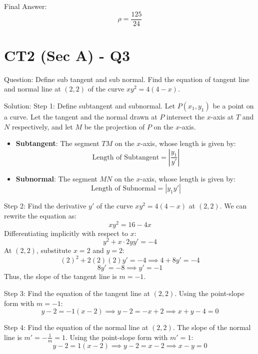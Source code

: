 \documentclass{article}
\begin{document}
Final Answer:
\[
\boxed{\rho = \frac{125}{24}}
\]

\section*{CT2 (Sec A) - Q3}
Question:
Define sub tangent and sub normal. Find the equation of tangent line and normal line at $(2, 2)$ of the curve $xy^2 = 4(4-x)$.

Solution:
Step 1: Define subtangent and subnormal.
Let $P(x_1, y_1)$ be a point on a curve. Let the tangent and the normal drawn at $P$ intersect the $x$-axis at $T$ and $N$ respectively, and let $M$ be the projection of $P$ on the $x$-axis.
\begin{itemize}
    \item \textbf{Subtangent}: The segment $TM$ on the $x$-axis, whose length is given by:
    \[
    \text{Length of Subtangent} = \left| \frac{y_1}{y'} \right|
    \]
    \item \textbf{Subnormal}: The segment $MN$ on the $x$-axis, whose length is given by:
    \[
    \text{Length of Subnormal} = |y_1 y'|
    \]
\end{itemize}

Step 2: Find the derivative $y'$ of the curve $xy^2 = 4(4-x)$ at $(2, 2)$.
We can rewrite the equation as:
\[
xy^2 = 16 - 4x
\]
Differentiating implicitly with respect to $x$:
\[
y^2 + x \cdot 2y y' = -4
\]
At $(2, 2)$, substitute $x = 2$ and $y = 2$:
\[
(2)^2 + 2(2)(2)y' = -4 \implies 4 + 8y' = -4
\]
\[
8y' = -8 \implies y' = -1
\]
Thus, the slope of the tangent line is $m = -1$.

Step 3: Find the equation of the tangent line at $(2, 2)$.
Using the point-slope form with $m = -1$:
\[
y - 2 = -1(x - 2) \implies y - 2 = -x + 2 \implies x + y - 4 = 0
\]

Step 4: Find the equation of the normal line at $(2, 2)$.
The slope of the normal line is $m' = -\frac{1}{m} = 1$.
Using the point-slope form with $m' = 1$:
\[
y - 2 = 1(x - 2) \implies y - 2 = x - 2 \implies x - y = 0
\]
\end{document}
